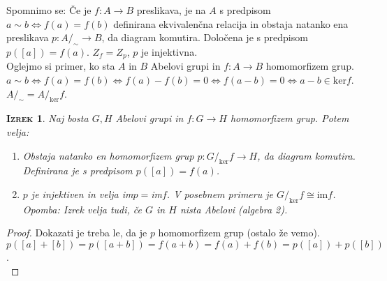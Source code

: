 \documentclass[a4paper,12pt]{article}
\newtheorem*{izrek}{\textsc{Izrek}}
\begin{document}
Spomnimo se: Če je $f:A\to B$ preslikava, je na $A$ s predpisom $a\sim b \Leftrightarrow f(a)=f(b)$ definirana ekvivalenčna relacija in obstaja natanko ena preslikava $p: A/_\sim \to B$, da diagram \Smiley{} komutira. Določena je s predpisom $p([a])=f(a)$. $Z_f=Z_p$, $p$ je injektivna. \\

Oglejmo si primer, ko sta $A$ in $B$ Abelovi grupi in $f:A\to B$ homomorfizem grup. \\

$a\sim b \Leftrightarrow f(a)=f(b) \Leftrightarrow f(a)-f(b) = 0  \Leftrightarrow f(a-b)=0 \Leftrightarrow a-b\in \text{ker}f$. \\

$A/_\sim = A/_\text{ker}f$. \\

\begin{izrek}
Naj bosta $G,H$ Abelovi grupi in $f:G\to H$ homomorfizem grup. Potem velja:
\begin{enumerate}
\item Obstaja natanko en homomorfizem grup $p:G/_\text{ker}f \to H$, da diagram \Smiley{} komutira. Definirana je s predpisom $p([a])=f(a)$. 
\item $p$ je injektiven in velja im$p=$im$f$. V posebnem primeru je $G/_\text{ker}f \cong \text{im}f$. \\

Opomba: Izrek velja tudi, če $G$ in $H$ nista Abelovi (algebra 2).\\ 
\end{enumerate}
\end{izrek}

\begin{proof}
Dokazati je treba le, da je $p$ homomorfizem grup (ostalo že vemo). \\

$p([a]+[b])=p([a+b])=f(a+b)=f(a)+f(b)=p([a])+p([b])$. \\
\end{proof}
\end{document}
